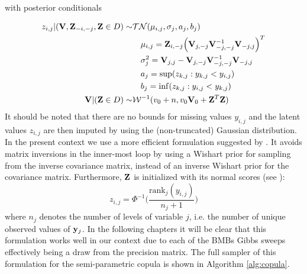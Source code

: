 with posterior conditionals

\begin{align*}
	z_{i,j}|(\mathbf{V}, \mathbf{Z}_{-i,-j}, \mathbf{Z}\in D)  
	\sim &                                                                                                 
	\mathcal{TN}
	(\mu_{i,j}, \sigma_j, a_j, b_j)
	\\
	     & \quad\mu_{i,j}=\mathbf{Z}_{i,-j}\Big(\mathbf{V}_{j,-j} \mathbf{V}_{-j,-j}^{-1} \mathbf{V}_{-j,j}\Big)^T 
	\\
	     & \quad\sigma_j^2 = \mathbf{V}_{j,j} - \mathbf{V}_{j,-j}\mathbf{V}_{-j,-j}^{-1}\mathbf{V}_{-j,j}          
	\\
	     & \quad a_j = \sup(z_{k,j} : y_{k,j}<y_{i,j})                                                     
	\\
	     & \quad b_j = \inf(z_{k,j} : y_{i,j}<y_{k,j})                                                     
	\\
	\mathbf{V}|(\mathbf{Z}\in D) 
	\sim &                                                                                                 
	\mathcal{W}^{-1}(v_0+n, v_0\mathbf{V}_0+ \mathbf{Z}^T\mathbf{Z})
\end{align*}
It should be noted that there are no bounds for missing values $y_{i,j}$ 
and the latent values $z_{i,j}$ are then imputed by using the (non-truncated) Gaussian distribution.
In the present context we use a more efficient formulation suggested by \citet{adametz2014information}.
It avoids matrix inversions in the inner-most loop by using a Wishart prior for sampling from the inverse covariance matrix, instead of an inverse Wishart prior for the covariance matrix.
Furthermore, $\mathbf{Z}$ is initialized with its normal scores (see \citet{rey2012meta}):
$${z}_{i,j} = \Phi^{-1}\Big(\frac{\text{rank}_j(y_{i,j})}{n_j+1} \Big)$$
where $n_j$ denotes the number of levels of variable $j$, i.e. the number of unique observed values of $\mathbf{y}_j$.
In the following chapters it will be clear that this formulation works well in our context due to each of the \gls{BMB}s Gibbs sweeps effectively being a draw from the precision matrix.
The full sampler of this formulation for the semi-parametric copula is shown in Algorithm \autoref{alg:copula}. 

